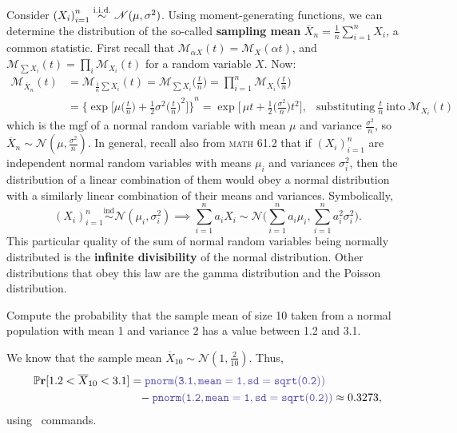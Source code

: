 Consider \({(X_i)}_{i=1}^n \stackrel{\mathrm{i.i.d.}}{\sim} \mathscr{N}(\mu, \sigma^2)\). 
Using moment-generating functions, we can determine the distribution of the so-called \textbf{sampling mean} \(\overline{X}_n = \frac{1}{n}\sum_{i=1}^n X_i\), a common statistic. 
First recall that \(\mathscr{M}_{\alpha X}(t) = \mathscr{M}_X(\alpha t)\), and \(\mathscr{M}_{\sum X_i}(t) = \prod_i \mathscr{M}_{X_i}(t)\) for a random variable \(X\). Now:\begin{align*}
    \mathscr{M}_{\overline{X}_n}(t) &= \mathscr{M}_{\frac{1}{n}\sum X_i}(t) = \mathscr{M}_{\sum X_i} \bigl(\tfrac{t}{n}\bigr) = \prod_{i=1}^n \mathscr{M}_{X_i} \big(\tfrac{t}{n}\big) \\
    &= {\biggl\{ \exp\bigg[\mu \biggl(\frac{t}{n}\bigg) + \frac{1}{2}\sigma^2 {\biggl(\frac{t}{n}\bigg)}^2\bigg]\biggr\} }^n = \exp \bigg[\, \mu t + \frac{1}{2}\biggl(\frac{\sigma^2}{n}\bigg)t^2\bigg],&\text{substituting}~\frac{t}{n}~\text{into}~\mathscr{M}_{X_i}(t)
\end{align*}which is the mgf of a normal random variable with mean \(\mu\) and variance \(\frac{\sigma^2}{n}\), so \(\overline{X}_n \sim \mathscr{N}(\mu, \frac{\sigma^2}{n})\). 
In general, recall also from \textsc{math} 61.2 that if \({(X_i)}_{i=1}^n\) are independent normal random variables with means \(\mu_i\) and variances \(\sigma_i^2\), then the distribution of a linear combination of them would obey a normal distribution with a similarly linear combination of their means and variances. 
Symbolically,\[
    {(X_i)}_{i=1}^n \overset{\mathrm{ind}}{\sim} \mathscr{N} (\mu_i, \sigma_i^2) \implies \sum_{i=1}^n a_i X_i \sim \mathscr{N}\Big(\sum_{i=1}^n a_i \mu_i, \sum_{i=1}^n a_i^2 \sigma_i^2\Big). 
\]This particular quality of the sum of normal random variables being normally distributed is the \textbf{infinite divisibility} of the normal distribution. 
Other distributions that obey this law are the gamma distribution and the Poisson distribution. 

\begin{example}
    Compute the probability that the sample mean of size 10 taken from a normal population with mean 1 and variance 2 has a value between 1.2 and 3.1. 

    We know that the sample mean \(\overline{X}_{10} \sim \mathscr{N}(1, \frac{2}{10})\). 
    Thus,\begin{align*}
    \Pr [1.2 <\overline{X}_{10} <3.1] &= \code{pnorm(3.1,mean=1,sd=sqrt(0.2))} \\ &\phantom{=}- \code{pnorm(1.2,mean=1,sd=sqrt(0.2))} \approx 0.3273,\end{align*}
    using \R~commands. 
\end{example}

